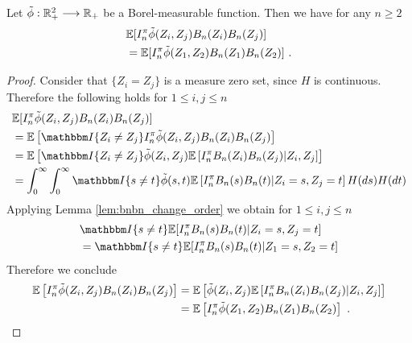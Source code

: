 \begin{lemma} \label{lem:zizone}
	Let $\tilde{\phi}: \mathbb{R}^2_+ \longrightarrow \mathbb{R}_+$ be a Borel-measurable function. Then we have for any $n\geq 2$ 
	\begin{align*}
	&\mathbb{E}[I_n^\pi \tilde{\phi}(Z_{i},Z_{j}) B_n(Z_{i}) B_n(Z_{j})]\\
	& = \mathbb{E}[I_n^\pi \tilde{\phi}(Z_1,Z_2) B_n(Z_1) B_n(Z_2)]\textrm{ .}
	\end{align*}
	\begin{proof}
		Consider that $\{Z_i=Z_j\}$ is a measure zero set, since $H$ is continuous. Therefore the following holds for $1\leq i,j \leq n$ 
		\begin{align*}
			& \E[I_n^\pi \tilde{\phi}(Z_{i},Z_{j}) B_n(Z_{i}) B_n(Z_{j})]\\
			&= \E\left[\I{Z_i\neq Z_j}I_n^\pi\tilde{\phi}(Z_{i},Z_{j}) B_n(Z_{i}) B_n(Z_{j})\right]\\
			&= \E\left[\I{Z_i\neq Z_j}\tilde{\phi}(Z_{i},Z_{j}) \E\left[I_n^\pi B_n(Z_{i}) B_n(Z_{j})| Z_i,Z_j\right]\right]\\
			&= \int_{0}^{\infty}\int_{0}^{\infty}\I{s\neq t}\tilde{\phi}(s,t) \E\left[I_n^\pi B_n(s) B_n(t)| Z_i=s,Z_j=t\right]H(ds)H(dt)
		\end{align*}
		Applying Lemma \ref{lem:bnbn_change_order} we obtain for $1\leq i,j\leq n$
		\begin{align*}
			&\I{s\neq t} \E[I_n^\pi B_n(s)B_n(t)|Z_i=s, Z_j=t]\\
			&= \I{s\neq t} \E[I_n^\pi B_n(s)B_n(t)|Z_1=s, Z_2=t]
		\end{align*}
		Therefore we conclude
		\begin{align*}
			\mathbb{E}\left[I_n^\pi \tilde{\phi}(Z_{i},Z_{j}) B_n(Z_{i}) B_n(Z_{j})\right] &= \mathbb{E}\left[\tilde{\phi}(Z_{i},Z_{j}) \mathbb{E}\left[I_n^\pi B_n(Z_{i}) B_n(Z_{j})| Z_i,Z_j\right]\right]\\
			&= \mathbb{E}\left[I_n^\pi \tilde{\phi}(Z_{1},Z_{2}) B_n(Z_{1}) B_n(Z_{2})\right]\textrm{ .}
		\end{align*}
	\end{proof}
\end{lemma}


